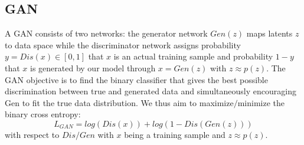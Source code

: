 \subsection{GAN}
A GAN\cite{goodfellow2014generative} consists of two networks: the generator network $Gen(z)$ maps latents $z$ to data space while the discriminator network assigns probability $y = Dis(x) \in [0, 1]$ that $x$ is an actual training sample and probability $1 - y$ that $x$ is generated by our model through $x = Gen(z)$ with $z \approx p(z)$. The GAN objective is to find the binary classifier that gives the best possible discrimination between true and generated data and simultaneously encouraging Gen to fit the true data distribution. We thus aim to maximize$/$minimize the binary cross entropy:
\begin{equation}
	L_{GAN} = log(Dis(x)) + log(1 - Dis(Gen(z)))
\end{equation}
with respect to $Dis / Gen$ with $x$ being a training sample and $z \approx p(z)$.